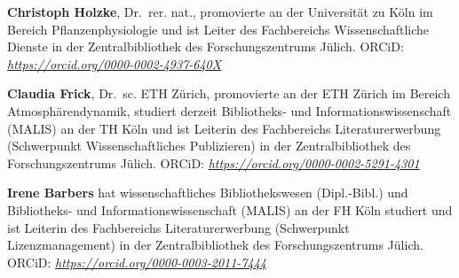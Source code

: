 \documentclass[a4paper,
fontsize=11pt,
oneside,
numbers=noperiodatend,
parskip=half-,
bibliography=totoc,
final
]{scrartcl}
\begin{document}
\textbf{Christoph Holzke}, Dr.~rer. nat., promovierte an der Universität
zu Köln im Bereich Pflanzenphysiologie und ist Leiter des Fachbereichs
Wissenschaftliche Dienste in der Zentralbibliothek des
Forschungszentrums Jülich. ORCiD:
\href{https://orcid.org/0000-0002-4937-640X}{\emph{https://orcid.org/0000-0002-4937-640X}}

\textbf{Claudia Frick}, Dr.~sc. ETH Zürich, promovierte an der ETH
Zürich im Bereich Atmosphärendynamik, studiert derzeit Bibliotheks- und
Informationswissenschaft (MALIS) an der TH Köln und ist Leiterin des
Fachbereichs Literaturerwerbung (Schwerpunkt Wissenschaftliches
Publizieren) in der Zentralbibliothek des Forschungszentrums Jülich.
ORCiD:
\href{https://orcid.org/0000-0002-5291-4301}{\emph{https://orcid.org/0000-0002-5291-4301}}

\textbf{Irene Barbers} hat wissenschaftliches Bibliothekswesen
(Dipl.-Bibl.) und Bibliotheks- und Informationswissenschaft (MALIS) an
der FH Köln studiert und ist Leiterin des Fachbereichs
Literaturerwerbung (Schwerpunkt Lizenzmanagement) in der
Zentralbibliothek des Forschungszentrums Jülich. ORCiD:
\href{https://orcid.org/0000-0003-2011-7444}{\emph{https://orcid.org/0000-0003-2011-7444}}
\end{document}
